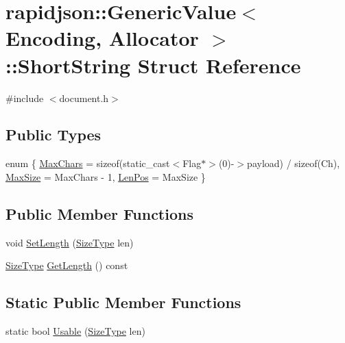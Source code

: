 \hypertarget{structrapidjson_1_1_generic_value_1_1_short_string}{}\section{rapidjson\+::Generic\+Value$<$ Encoding, Allocator $>$\+::Short\+String Struct Reference}
\label{structrapidjson_1_1_generic_value_1_1_short_string}


{\ttfamily \#include $<$document.\+h$>$}

\subsection*{Public Types}
\begin{DoxyCompactItemize}
\item 
enum \{ \mbox{\hyperlink{structrapidjson_1_1_generic_value_1_1_short_string_a77aa02281a84b131e4d4eb3a13146815a78cfea23edd64c3767922023807ced64}{Max\+Chars}} = sizeof(static\+\_\+cast$<$Flag$\ast$$>$(0)-\/$>$payload) / sizeof(Ch), 
\mbox{\hyperlink{structrapidjson_1_1_generic_value_1_1_short_string_a77aa02281a84b131e4d4eb3a13146815a8e7b3228397abe6824e515799763198f}{Max\+Size}} = Max\+Chars -\/ 1, 
\mbox{\hyperlink{structrapidjson_1_1_generic_value_1_1_short_string_a77aa02281a84b131e4d4eb3a13146815ac9ee3c47d8cbe0265c8bc0d5da4e08d9}{Len\+Pos}} = Max\+Size
 \}
\end{DoxyCompactItemize}
\subsection*{Public Member Functions}
\begin{DoxyCompactItemize}
\item 
void \mbox{\hyperlink{structrapidjson_1_1_generic_value_1_1_short_string_ac39a049dc7bca3f337ed858686065752}{Set\+Length}} (\mbox{\hyperlink{namespacerapidjson_a44eb33eaa523e36d466b1ced64b85c84}{Size\+Type}} len)
\item 
\mbox{\hyperlink{namespacerapidjson_a44eb33eaa523e36d466b1ced64b85c84}{Size\+Type}} \mbox{\hyperlink{structrapidjson_1_1_generic_value_1_1_short_string_a554140e81e30bb27c92b1074b0f34c0e}{Get\+Length}} () const
\end{DoxyCompactItemize}
\subsection*{Static Public Member Functions}
\begin{DoxyCompactItemize}
\item 
static bool \mbox{\hyperlink{structrapidjson_1_1_generic_value_1_1_short_string_a0ab90809c60e2106deadbc74ce9e6f3b}{Usable}} (\mbox{\hyperlink{namespacerapidjson_a44eb33eaa523e36d466b1ced64b85c84}{Size\+Type}} len)
\end{DoxyCompactItemize}
